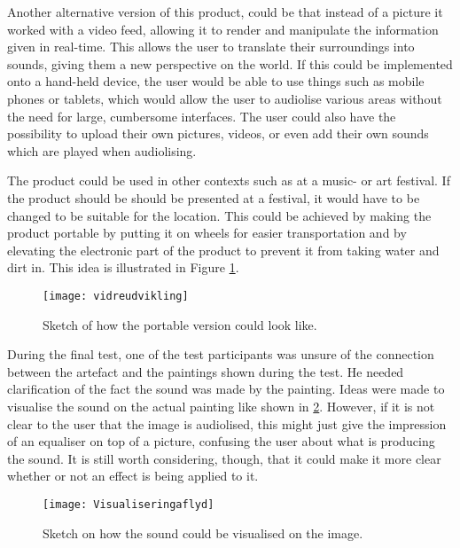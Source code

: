 Another alternative version of this product, could be that instead of a picture it worked with a video feed, allowing it to render and manipulate the information given in real-time. This allows the user to translate their surroundings into sounds, giving them a new perspective on the world. If this could be implemented onto a hand-held device, the user would be able to use things such as mobile phones or tablets, which would allow the user to audiolise various areas without the need for large, cumbersome interfaces. The user could also have the possibility to upload their own pictures, videos, or even add their own sounds which are played when audiolising.

The product could be used in other contexts such as at a music- or art festival. If the product should be should be presented at a festival, it would have to be changed to be suitable for the location. This could be achieved by making the product portable by putting it on wheels for easier transportation and by elevating the electronic part of the product to prevent it from taking water and dirt in. This idea is illustrated in Figure \ref{fig:vidreudvikling}.

\begin{figure}[!h]
\centering
\texttt{[image: vidreudvikling]}
\caption{\label{fig:vidreudvikling} Sketch of how the portable version could look like.}
\end{figure}

During the final test, one of the test participants was unsure of the connection between the artefact and the paintings shown during the test. He needed clarification of the fact the sound was made by the painting. Ideas were made to visualise the sound on the actual painting like shown in \ref{fig:Visualiseringaflyd}. However, if it is not clear to the user that the image is audiolised, this might just give the impression of an equaliser on top of a picture, confusing the user about what is producing the sound. It is still worth considering, though, that it could make it more clear whether or not an effect is being applied to it. 

\begin{figure}[!h]
\centering
\texttt{[image: Visualiseringaflyd]}
\caption{\label{fig:Visualiseringaflyd} Sketch on how the sound could be visualised on the image.}
\end{figure}




